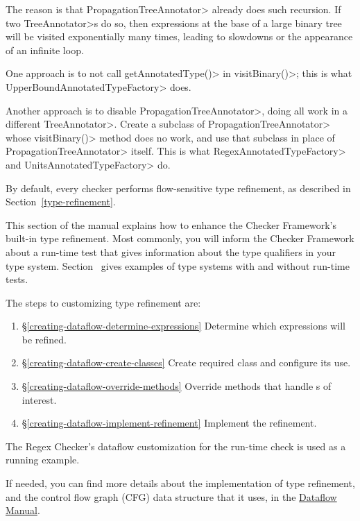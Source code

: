 \noindent
The reason is that \<PropagationTreeAnnotator> already does such recursion.  If
two \<TreeAnnotator>s do so, then expressions at the base of a large binary tree
will be visited exponentially many times, leading to slowdowns or the appearance
of an infinite loop.

One approach is to not call \<getAnnotatedType()> in \<visitBinary()>; this is
what \<UpperBoundAnnotatedTypeFactory> does.

Another approach is to disable \<PropagationTreeAnnotator>, doing all work in a
different \<TreeAnnotator>.  Create a subclass of \<PropagationTreeAnnotator>
whose \<visitBinary()> method does no work, and use that subclass in place of
\<PropagationTreeAnnotator> itself.  This is what \<RegexAnnotatedTypeFactory>
and \<UnitsAnnotatedTypeFactory> do.



By default, every checker performs flow-sensitive type refinement, as described
in Section~\ref{type-refinement}.

This section of the manual explains how to enhance the Checker Framework's
built-in type refinement.
Most commonly, you will inform the Checker Framework about a run-time test
that gives information about the type qualifiers in your type system.
Section~ gives examples of
type systems with and without run-time tests.

The steps to customizing type refinement are:
\begin{enumerate}
\item{\S\ref{creating-dataflow-determine-expressions}}
  Determine which expressions will be refined.
\item{\S\ref{creating-dataflow-create-classes}}
  Create required class and configure its use.
\item{\S\ref{creating-dataflow-override-methods}}
  Override methods that handle s of interest.
\item{\S\ref{creating-dataflow-implement-refinement}}
  Implement the refinement.
\end{enumerate}

The Regex Checker's dataflow customization for the
run-time check is used as a running example.

If needed, you can find more details about the implementation of
type refinement, and the control flow graph (CFG) data
structure that it uses, in the
\href{https://checkerframework.org/manual/checker-framework-dataflow-manual.pdf}{Dataflow
  Manual}.


